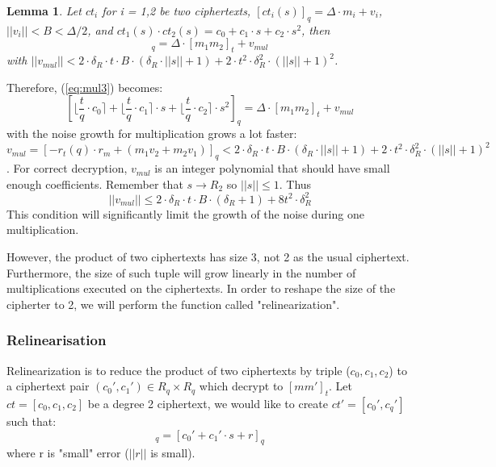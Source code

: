 \documentclass[A4paper,12pt]{article}
\newtheorem{lemma}[theorem]{Lemma}
\begin{document}
\begin{lemma}
Let $ct_i$ for i = 1,2 be two ciphertexts, $[ct_i(s)]_q = \Delta \cdot m_i + v_i$, $||v_i|| < B < \Delta / 2$, and $ct_1(s) \cdot ct_2(s) = c_0 + c_1 \cdot s + c_2 \cdot s^2$, then
\begin{equation*}
	[\lfloor \frac{t}{q} \cdot c_0 \rceil  +  \lfloor \frac{t}{q} \cdot c_1 \rceil  \cdot s + 	\lfloor \frac{t}{q} \cdot c_2 \rceil   \cdot s^2]_q = \Delta \cdot [m_1m_2]_t + v_{mul}
\end{equation*}
with $||v_{mul}|| < 2 \cdot \delta_R \cdot t \cdot B \cdot(\delta_R \cdot ||s|| + 1) + 2 \cdot t^2 \cdot \delta_R^2 \cdot (||s|| + 1)^2$.
\end{lemma}
Therefore, (\ref{eq:mul3}) becomes:
\begin{equation}\label{eq:mul}
[\lfloor \frac{t}{q} \cdot c_0 \rceil  +  \lfloor \frac{t}{q} \cdot c_1 \rceil  \cdot s + 	\lfloor \frac{t}{q} \cdot c_2 \rceil   \cdot s^2]_q = \Delta \cdot [m_1m_2]_t + v_{mul}
\end{equation} 
with the noise growth for multiplication grows a lot faster: $v_{mul} = [- r_t(q) \cdot r_m + (m_1v_2 + m_2v_1)]_q < 2 \cdot \delta_R \cdot t \cdot B \cdot(\delta_R \cdot ||s|| + 1) + 2 \cdot t^2 \cdot \delta_R^2 \cdot (||s|| + 1)^2$. For correct decryption, $v_{mul}$ is an integer polynomial that should have small enough coefficients. Remember that $s \rightarrow R_2$ so $||s|| \leq 1$. Thus
\begin{equation*}
	||v_{mul}|| \leq 2 \cdot \delta_R \cdot t \cdot B  \cdot (\delta_R + 1) + 8t^2 \cdot \delta_R^2
\end{equation*} 
This condition will significantly limit the growth of the noise during one multiplication.

However, the product of two ciphertexts has size 3, not 2 as the usual ciphertext. Furthermore, the size of such tuple will grow linearly in the number of multiplications executed on the ciphertexts. In order to reshape the size of the cipherter to 2, we will perform the function called "relinearization".
	\subsubsection{Relinearisation}
Relinearization is to reduce the product of two ciphertexts by triple ($c_0, c_1, c_2$) to a ciphertext pair $(c_0', c_1') \in R_q \times R_q$ which decrypt to $[mm']_t$. Let $ct = [c_0, c_1, c_2]$ be a degree 2 ciphertext, we would like to create $ct' = [c_0', c_q']$ such that:
\begin{equation*}
	[c_0 + c_1 \cdot s + c_2 \cdot s^2]_q = [ c_0' + c_1' \cdot s + r]_q
\end{equation*}
where r is "small" error ($||r||$ is small).
\end{document}
